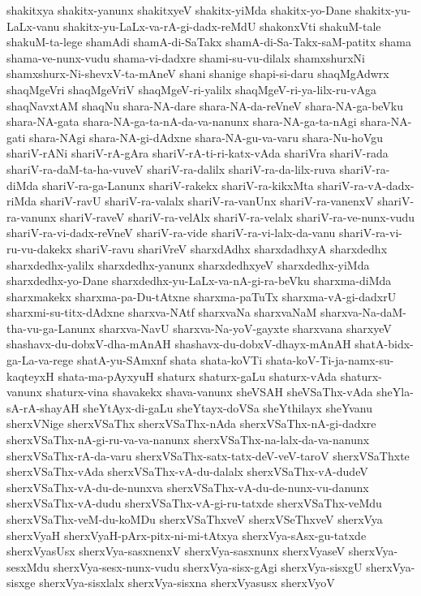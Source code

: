 {shakitxya
shakitx-yanunx
shakitxyeV
shakitx-yiMda
shakitx-yo-Dane
shakitx-yu-LaLx-vanu
shakitx-yu-LaLx-va-rA-gi-dadx-reMdU
shakonxVti
shakuM-tale
shakuM-ta-lege
shamAdi
shamA-di-SaTakx
shamA-di-Sa-Takx-saM-patitx
shama
shama-ve-nunx-vudu
shama-vi-dadxre
shami-su-vu-dilalx
shamxshurxNi
shamxshurx-Ni-shevxV-ta-mAneV
shani
shanige
shapi-si-daru
shaqMgAdwrx
shaqMgeVri
shaqMgeVriV
shaqMgeV-ri-yalilx
shaqMgeV-ri-ya-lilx-ru-vAga
shaqNavxtAM
shaqNu
shara-NA-dare
shara-NA-da-reVneV
shara-NA-ga-beVku
shara-NA-gata
shara-NA-ga-ta-nA-da-va-nanunx
shara-NA-ga-ta-nAgi
shara-NA-gati
shara-NAgi
shara-NA-gi-dAdxne
shara-NA-gu-va-varu
shara-Nu-hoVgu
shariV-rANi
shariV-rA-gAra
shariV-rA-ti-ri-katx-vAda
shariVra
shariV-rada
shariV-ra-daM-ta-ha-vuveV
shariV-ra-dalilx
shariV-ra-da-lilx-ruva
shariV-ra-diMda
shariV-ra-ga-Lanunx
shariV-rakekx
shariV-ra-kikxMta
shariV-ra-vA-dadx-riMda
shariV-ravU
shariV-ra-valalx
shariV-ra-vanUnx
shariV-ra-vanenxV
shariV-ra-vanunx
shariV-raveV
shariV-ra-velAlx
shariV-ra-velalx
shariV-ra-ve-nunx-vudu
shariV-ra-vi-dadx-reVneV
shariV-ra-vide
shariV-ra-vi-lalx-da-vanu
shariV-ra-vi-ru-vu-dakekx
shariV-ravu
shariVreV
sharxdAdhx
sharxdadhxyA
sharxdedhx
sharxdedhx-yalilx
sharxdedhx-yanunx
sharxdedhxyeV
sharxdedhx-yiMda
sharxdedhx-yo-Dane
sharxdedhx-yu-LaLx-va-nA-gi-ra-beVku
sharxma-diMda
sharxmakekx
sharxma-pa-Du-tAtxne
sharxma-paTuTx
sharxma-vA-gi-dadxrU
sharxmi-su-titx-dAdxne
sharxva-NAtf
sharxvaNa
sharxvaNaM
sharxva-Na-daM-tha-vu-ga-Lanunx
sharxva-NavU
sharxva-Na-yoV-gayxte
sharxvana
sharxyeV
shashavx-du-dobxV-dha-mAnAH
shashavx-du-dobxV-dhayx-mAnAH
shatA-bidx-ga-La-va-rege
shatA-yu-SAmxnf
shata
shata-koVTi
shata-koV-Ti-ja-namx-su-kaqteyxH
shata-ma-pAyxyuH
shaturx
shaturx-gaLu
shaturx-vAda
shaturx-vanunx
shaturx-vina
shavakekx
shava-vanunx
sheVSAH
sheVSaThx-vAda
sheYla-sA-rA-shayAH
sheYtAyx-di-gaLu
sheYtayx-doVSa
sheYthilayx
sheYvanu
sherxVNige
sherxVSaThx
sherxVSaThx-nAda
sherxVSaThx-nA-gi-dadxre
sherxVSaThx-nA-gi-ru-va-va-nanunx
sherxVSaThx-na-lalx-da-va-nanunx
sherxVSaThx-rA-da-varu
sherxVSaThx-satx-tatx-deV-veV-taroV
sherxVSaThxte
sherxVSaThx-vAda
sherxVSaThx-vA-du-dalalx
sherxVSaThx-vA-dudeV
sherxVSaThx-vA-du-de-nunxva
sherxVSaThx-vA-du-de-nunx-vu-danunx
sherxVSaThx-vA-dudu
sherxVSaThx-vA-gi-ru-tatxde
sherxVSaThx-veMdu
sherxVSaThx-veM-du-koMDu
sherxVSaThxveV
sherxVSeThxveV
sherxVya
sherxVyaH
sherxVyaH-pArx-pitx-ni-mi-tAtxya
sherxVya-sAsx-gu-tatxde
sherxVyasUsx
sherxVya-sasxnenxV
sherxVya-sasxnunx
sherxVyaseV
sherxVya-sesxMdu
sherxVya-sesx-nunx-vudu
sherxVya-sisx-gAgi
sherxVya-sisxgU
sherxVya-sisxge
sherxVya-sisxlalx
sherxVya-sisxna
sherxVyasusx
sherxVyoV
}
